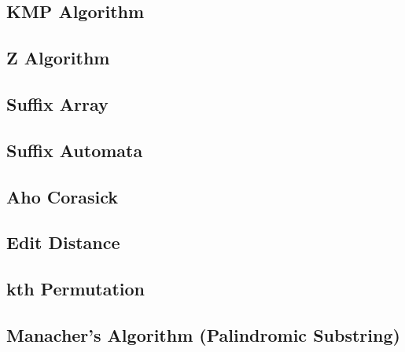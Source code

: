 \subsection{KMP Algorithm}


\subsection{Z Algorithm}


\subsection{Suffix Array}

% 
% 

\subsection{Suffix Automata}


\subsection{Aho Corasick}


\subsection{Edit Distance}


\subsection{kth Permutation}


\subsection{Manacher's Algorithm (Palindromic Substring)}


